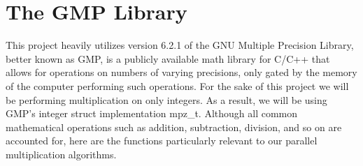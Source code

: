 \documentclass[12pt]{article}
\begin{document}
\section{The GMP Library}
	This project heavily utilizes version 6.2.1 of the GNU Multiple Precision Library, better known as GMP, is a publicly available math library for C/C++ that allows for operations on numbers of varying precisions, only gated by the memory of the computer performing such operations. For the sake of this project we will be performing multiplication on only integers. As a result, we will be using GMP’s integer struct implementation mpz_t. Although all common mathematical operations such as addition, subtraction, division, and so on are accounted for, here are the functions particularly relevant to our parallel multiplication algorithms.\par
\end{document}
